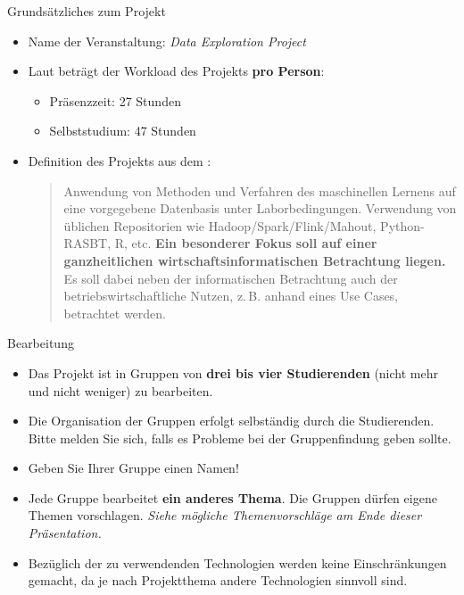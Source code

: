 \begin{dwHeaderFrame}{Grundsätzliches zum Projekt}
	\begin{itemize}
		\item Name der Veranstaltung: \textit{Data Exploration Project}
		\item Laut \modulkatalog{} beträgt der Workload des Projekts \textbf{pro Person}:
		\begin{itemize}
			\item Präsenzzeit: 27 Stunden
			\item Selbststudium: 47 Stunden
		\end{itemize}
		\item Definition des Projekts aus dem \modulkatalog:
		\begin{quote}
			\glqq{}Anwendung von Methoden und Verfahren des maschinellen Lernens auf eine vorgegebene Datenbasis unter Laborbedingungen. Verwendung von üblichen Repositorien wie Hadoop/Spark/Flink/Mahout, Python-RASBT, R, etc.
			\textbf{Ein besonderer Fokus soll auf einer ganzheitlichen wirtschaftsinformatischen Betrachtung liegen.} Es soll dabei neben der informatischen Betrachtung auch der betriebswirtschaftliche Nutzen, z.\,B. anhand eines Use Cases, betrachtet werden.\grqq{}
		\end{quote}
	\end{itemize}
\end{dwHeaderFrame}


\begin{dwHeaderFrame}{Bearbeitung}
	\begin{itemize}
		\item Das Projekt ist in Gruppen von \textbf{drei bis vier Studierenden} (nicht mehr und nicht weniger) zu bearbeiten.
		\item Die Organisation der Gruppen erfolgt selbständig durch die Studierenden.
			Bitte melden Sie sich, falls es Probleme bei der Gruppenfindung geben sollte.
		\item Geben Sie Ihrer Gruppe einen Namen!
		\item Jede Gruppe bearbeitet \textbf{ein anderes Thema}. Die Gruppen dürfen eigene Themen vorschlagen.
			\textit{Siehe mögliche Themenvorschläge am Ende dieser Präsentation.}
		\item Bezüglich der zu verwendenden Technologien werden keine Einschränkungen gemacht, da je nach Projektthema
			andere Technologien sinnvoll sind.
	\end{itemize}
	
\end{dwHeaderFrame}


